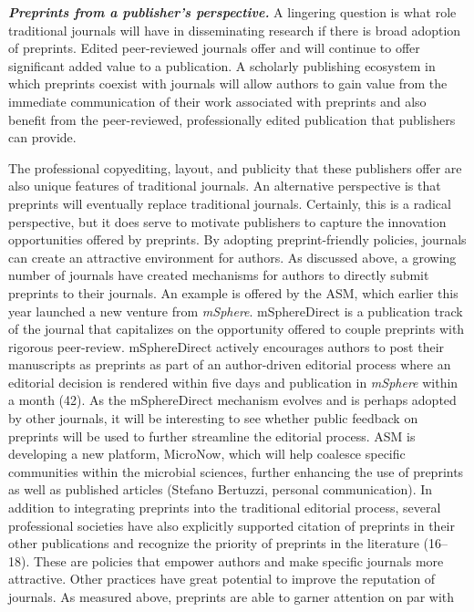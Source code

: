 \documentclass[11pt,]{article}
\begin{document}
\textbf{\emph{Preprints from a publisher's perspective.}} A lingering
question is what role traditional journals will have in disseminating
research if there is broad adoption of preprints. Edited peer-reviewed
journals offer and will continue to offer significant added value to a
publication. A scholarly publishing ecosystem in which preprints coexist
with journals will allow authors to gain value from the immediate
communication of their work associated with preprints and also benefit
from the peer-reviewed, professionally edited publication that
publishers can provide.

The professional copyediting, layout, and publicity that these
publishers offer are also unique features of traditional journals. An
alternative perspective is that preprints will eventually replace
traditional journals. Certainly, this is a radical perspective, but it
does serve to motivate publishers to capture the innovation
opportunities offered by preprints. By adopting preprint-friendly
policies, journals can create an attractive environment for authors. As
discussed above, a growing number of journals have created mechanisms
for authors to directly submit preprints to their journals. An example
is offered by the ASM, which earlier this year launched a new venture
from \emph{mSphere}. mSphereDirect is a publication track of the journal
that capitalizes on the opportunity offered to couple preprints with
rigorous peer-review. mSphereDirect actively encourages authors to post
their manuscripts as preprints as part of an author-driven editorial
process where an editorial decision is rendered within five days and
publication in \emph{mSphere} within a month (42). As the mSphereDirect
mechanism evolves and is perhaps adopted by other journals, it will be
interesting to see whether public feedback on preprints will be used to
further streamline the editorial process. ASM is developing a new
platform, MicroNow, which will help coalesce specific communities within
the microbial sciences, further enhancing the use of preprints as well
as published articles (Stefano Bertuzzi, personal communication). In
addition to integrating preprints into the traditional editorial
process, several professional societies have also explicitly supported
citation of preprints in their other publications and recognize the
priority of preprints in the literature (16--18). These are policies
that empower authors and make specific journals more attractive. Other
practices have great potential to improve the reputation of journals. As
measured above, preprints are able to garner attention on par with
\end{document}

